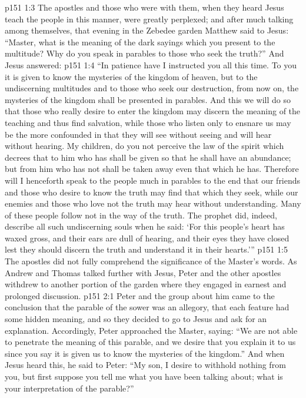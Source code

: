 \vs p151 1:3 \pc The apostles and those who were with them, when they heard Jesus teach the people in this manner, were greatly perplexed; and after much talking among themselves, that evening in the Zebedee garden Matthew said to Jesus: “Master, what is the meaning of the dark sayings which you present to the multitude? Why do you speak in parables to those who seek the truth?” And Jesus answered:
\vs p151 1:4 \textcolor{ubdarkred}{“In patience have I instructed you all this time. To you it is given to know the mysteries of the kingdom of heaven, but to the undiscerning multitudes and to those who seek our destruction, from now on, the mysteries of the kingdom shall be presented in parables. And this we will do so that those who really desire to enter the kingdom may discern the meaning of the teaching and thus find salvation, while those who listen only to ensnare us may be the more confounded in that they will see without seeing and will hear without hearing. My children, do you not perceive the law of the spirit which decrees that to him who has shall be given so that he shall have an abundance; but from him who has not shall be taken away even that which he has. Therefore will I henceforth speak to the people much in parables to the end that our friends and those who desire to know the truth may find that which they seek, while our enemies and those who love not the truth may hear without understanding. Many of these people follow not in the way of the truth. The prophet did, indeed, describe all such undiscerning souls when he said: ‘For this people’s heart has waxed gross, and their ears are dull of hearing, and their eyes they have closed lest they should discern the truth and understand it in their hearts.’”}
\vs p151 1:5 The apostles did not fully comprehend the significance of the Master’s words. As Andrew and Thomas talked further with Jesus, Peter and the other apostles withdrew to another portion of the garden where they engaged in earnest and prolonged discussion.
\vs p151 2:1 Peter and the group about him came to the conclusion that the parable of the sower was an allegory, that each feature had some hidden meaning, and so they decided to go to Jesus and ask for an explanation. Accordingly, Peter approached the Master, saying: “We are not able to penetrate the meaning of this parable, and we desire that you explain it to us since you say it is given us to know the mysteries of the kingdom.” And when Jesus heard this, he said to Peter: \textcolor{ubdarkred}{“My son, I desire to withhold nothing from you, but first suppose you tell me what you have been talking about; what is your interpretation of the parable?”}
